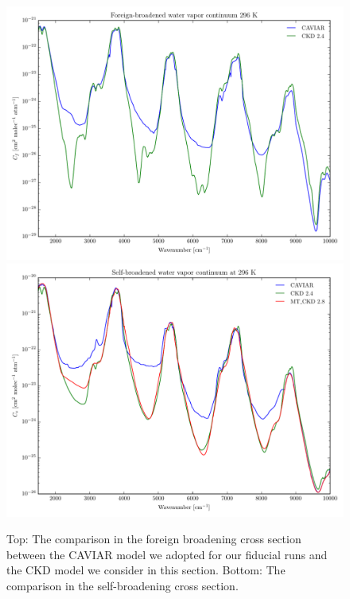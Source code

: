 \documentclass[11pt,numberedappendix,twocolappendix,]{emulateapj}
\begin{document}
{%
\begin{figure}[!t]
    \begin{center}
    \includegraphics[width=\hsize]{foreign_wvc.pdf}
    \includegraphics[width=\hsize]{self_wvc.pdf}
    \end{center}
\caption{Top: The comparison in the foreign broadening cross section between the CAVIAR model we adopted for our fiducial runs and the CKD model we consider in this section. Bottom: The comparison in the self-broadening cross section. }
\label{fig:wvc_CAVIAR_CKD}
\end{figure}

}
\end{document}
